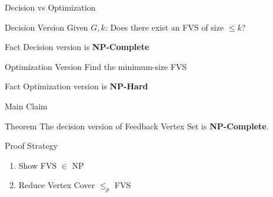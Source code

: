 \documentclass[aspectratio=169]{beamer}
\begin{document}
\begin{frame}{Decision vs Optimization}

	\begin{block}{Decision Version}
		Given $G, k$: Does there exist an FVS of size $\leq k$?
	\end{block}

	\begin{alertblock}{Fact}
		Decision version is \textbf{NP-Complete}
	\end{alertblock}

	\vspace{0.3cm}

	\begin{block}{Optimization Version}
		Find the minimum-size FVS
	\end{block}

	\begin{alertblock}{Fact}
		Optimization version is \textbf{NP-Hard}
	\end{alertblock}

\end{frame}

\begin{frame}{Main Claim}

	\begin{alertblock}{Theorem}
		The decision version of Feedback Vertex Set is \textbf{NP-Complete}.
	\end{alertblock}

	\vspace{0.3cm}

	\begin{block}{Proof Strategy}
		\begin{enumerate}
			\item Show FVS $\in$ NP
			\item Reduce Vertex Cover $\leq_p$ FVS
		\end{enumerate}
	\end{block}

\end{frame}
\end{document}
